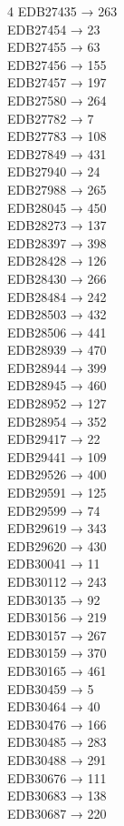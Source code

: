 \begin{multicols}{4}
EDB27435 → 263\\
EDB27454 → 23\\
EDB27455 → 63\\
EDB27456 → 155\\
EDB27457 → 197\\
EDB27580 → 264\\
EDB27782 → 7\\
EDB27783 → 108\\
EDB27849 → 431\\
EDB27940 → 24\\
EDB27988 → 265\\
EDB28045 → 450\\
EDB28273 → 137\\
EDB28397 → 398\\
EDB28428 → 126\\
EDB28430 → 266\\
EDB28484 → 242\\
EDB28503 → 432\\
EDB28506 → 441\\
EDB28939 → 470\\
EDB28944 → 399\\
EDB28945 → 460\\
EDB28952 → 127\\
EDB28954 → 352\\
EDB29417 → 22\\
EDB29441 → 109\\
EDB29526 → 400\\
EDB29591 → 125\\
EDB29599 → 74\\
EDB29619 → 343\\
EDB29620 → 430\\
EDB30041 → 11\\
EDB30112 → 243\\
EDB30135 → 92\\
EDB30156 → 219\\
EDB30157 → 267\\
EDB30159 → 370\\
EDB30165 → 461\\
EDB30459 → 5\\
EDB30464 → 40\\
EDB30476 → 166\\
EDB30485 → 283\\
EDB30488 → 291\\
EDB30676 → 111\\
EDB30683 → 138\\
EDB30687 → 220\\

\end{multicols}
